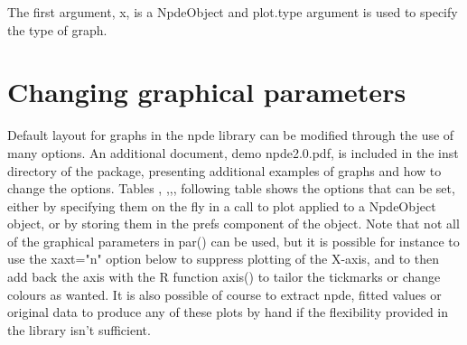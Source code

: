 \documentclass{report}
\begin{document}
\noindent The first argument, x, is a {\sf NpdeObject} and plot.type argument is used to specify the type of graph.

\section{Changing graphical parameters}

Default layout for graphs in the npde library can be modified through the use of many options. An additional document, demo npde2.0.pdf, is included in the inst directory of the package, presenting additional examples of graphs and how to change the options. 
Tables ,
,,, following table shows the options that can be set, either by specifying them on the fly in a call to plot applied to a NpdeObject object, or by storing them in the prefs component of the object. Note that not all of the graphical parameters in
par() can be used, but it is possible for instance to use the xaxt="n" option below to suppress plotting
of the X-axis, and to then add back the axis with the R function axis() to tailor the tickmarks or change
colours as wanted. It is also possible of course to extract npde, fitted values or original data to produce any of these plots by hand if the flexibility provided in the library isn’t sufficient. 
\end{document}
